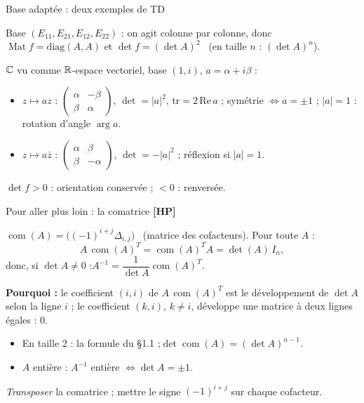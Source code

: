 \documentclass[aspectratio=169,11pt]{beamer}
\newcommand{\Mat}{\operatorname{Mat}}\newcommand{\Id}{\operatorname{Id}}\newcommand{\com}{\operatorname{com}}
\DeclareRobustCommand{\HP}{{\sffamily\bfseries\scriptsize\textcolor{Brique}{[HP]}}}
\begin{document}
\begin{frame}{Base adaptée : deux exemples de TD}
\begin{EX}
Base $(E_{11},E_{21},E_{12},E_{22})$ : on agit colonne par colonne, donc $\Mat f=\mathrm{diag}(A,A)$ et
$\det f=(\det A)^2$ \ (en taille $n$ : $(\det A)^n$).
\end{EX}
\pause
\begin{FORM}[Similitudes \HP{} --- TD 8]
$\mathbb{C}$ vu comme $\mathbb{R}$-espace vectoriel, base $(1,i)$, $a=\alpha+i\beta$ :
\begin{itemize}
\item $z\mapsto az$ : $\begin{pmatrix}\alpha&-\beta\\\beta&\alpha\end{pmatrix}$, $\det=|a|^2$, $\mathrm{tr}=2\,\mathrm{Re}\,a$ ;
      symétrie $\iff a=\pm1$ ; $|a|=1$ : rotation d'angle $\arg a$.
\item $z\mapsto a\bar z$ : $\begin{pmatrix}\alpha&\beta\\\beta&-\alpha\end{pmatrix}$, $\det=-|a|^2$ ; réflexion si $|a|=1$.
\end{itemize}
$\det f>0$ : orientation conservée ; $<0$ : renversée.
\end{FORM}
\end{frame}

\begin{frame}{Pour aller plus loin : la comatrice \HP}
\begin{HPBOX}
$\com(A)=\big((-1)^{i+j}\Delta_{i,j}\big)$ \ (matrice des cofacteurs). Pour toute $A$ :
\[A\,\com(A)^T=\com(A)^TA=\det(A)\,I_n,\]
donc, si $\det A\neq0$ :\quad $A^{-1}=\dfrac1{\det A}\com(A)^T$.
\end{HPBOX}
\pause
\textbf{Pourquoi :} le coefficient $(i,i)$ de $A\,\com(A)^T$ est le développement de $\det A$ selon la ligne $i$ ; le
coefficient $(k,i)$, $k\neq i$, développe une matrice à deux lignes égales : $0$.
\pause
\begin{itemize}
\item En taille 2 : la formule du §1.1 ;\quad $\det\com(A)=(\det A)^{n-1}$.
\item $A$ entière : $A^{-1}$ entière $\iff\det A=\pm1$.
\end{itemize}
\begin{PIEGE}
\emph{Transposer} la comatrice ; mettre le signe $(-1)^{i+j}$ sur chaque cofacteur.
\end{PIEGE}
\end{frame}
\end{document}
